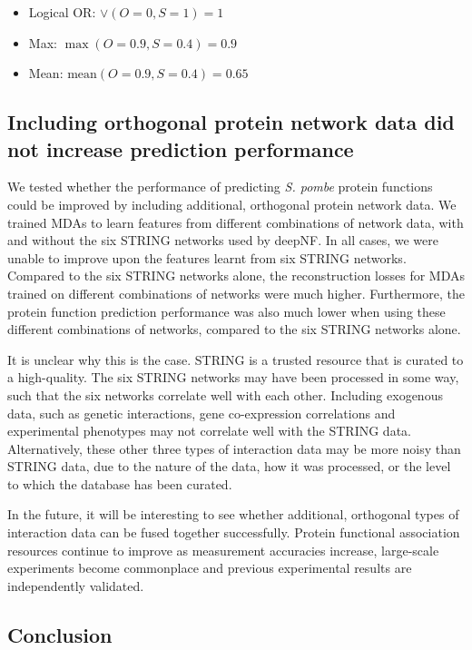 \begin{itemize}
    \item Logical OR: $\lor(O = 0, S = 1) = 1$
    \item Max: $\max(O = 0.9, S = 0.4) = 0.9$
    \item Mean: $\text{mean}(O = 0.9, S = 0.4) = 0.65$
\end{itemize}

\subsection{Including orthogonal protein network data did not increase prediction performance}

We tested whether the performance of predicting \emph{S. pombe} protein functions could be improved by including additional, orthogonal protein network data.
We trained MDAs to learn features from different combinations of network data, with and without the six STRING networks used by deepNF.
In all cases, we were unable to improve upon the features learnt from six STRING networks.
Compared to the six STRING networks alone, the reconstruction losses for MDAs trained on different combinations of networks were much higher.
Furthermore, the protein function prediction performance was also much lower when using these different combinations of networks, compared to the six STRING networks alone.

It is unclear why this is the case.
STRING is a trusted resource that is curated to a high-quality.
The six STRING networks may have been processed in some way, such that the six networks correlate well with each other.
Including exogenous data, such as genetic interactions, gene co-expression correlations and experimental phenotypes may not correlate well with the STRING data.
Alternatively, these other three types of interaction data may be more noisy than STRING data, due to the nature of the data, how it was processed, or the level to which the database has been curated.

In the future, it will be interesting to see whether additional, orthogonal types of interaction data can be fused together successfully.
Protein functional association resources continue to improve as measurement accuracies increase, large-scale experiments become commonplace and previous experimental results are independently validated.

\subsection{Conclusion}

